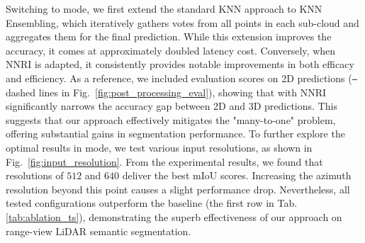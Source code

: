 Switching to \coolname{} mode, we first extend the standard KNN approach to KNN Ensembling, which iteratively gathers votes from all points in each sub-cloud and aggregates them for the final prediction. While this extension improves the accuracy, it comes at approximately doubled latency cost. Conversely, when NNRI is adapted, it consistently provides notable improvements in both efficacy and efficiency. As a reference, we included evaluation scores on 2D predictions (\texttt{--} dashed lines in Fig.~\ref{fig:post_processing_eval}), showing that \coolname{} with NNRI significantly narrows the accuracy gap between 2D and 3D predictions. This suggests that our approach effectively mitigates the "many-to-one" problem, offering substantial gains in segmentation performance.
 To further explore the optimal results in \coolname{} mode, we test various input resolutions, as shown in Fig.~\ref{fig:input_resolution}. From the experimental results, we found that resolutions of $512$ and $640$ deliver the best mIoU scores. Increasing the azimuth resolution beyond this point causes a slight performance drop. Nevertheless, all tested configurations outperform the baseline (the first row in Tab.\ref{tab:ablation_ts}), demonstrating the superb effectiveness of our approach on range-view LiDAR semantic segmentation.







